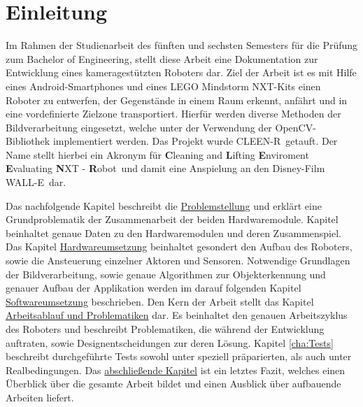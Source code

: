 \chapter{Einleitung}
\label{cha:einleitung}

Im Rahmen der Studienarbeit des fünften und sechsten Semesters für die Prüfung zum Bachelor of Engineering, stellt diese Arbeit eine Dokumentation zur Entwicklung eines kameragestützten Roboters dar. Ziel der Arbeit ist es mit Hilfe eines Android-Smartphones und eines LEGO Mindstorm NXT-Kits einen Roboter zu entwerfen, der Gegenstände in einem Raum erkennt, anfährt und in eine vordefinierte Zielzone transportiert. Hierfür werden diverse Methoden der Bildverarbeitung eingesetzt, welche unter der Verwendung der OpenCV-Bibliothek \cite{opencv_library} implementiert werden. Das Projekt wurde \glqq CLEEN-R\grqq\ getauft. Der Name stellt hierbei ein Akronym für \glqq \textbf{C}leaning and \textbf{L}ifting \textbf{E}nviroment \textbf{E}valuating \textbf{N}XT - \textbf{R}obot\grqq\ und damit eine Anspielung an den Disney-Film \glqq WALL-E\grqq\ dar.

Das nachfolgende Kapitel beschreibt die \hyperref[cha:Problemstellung]{Problemstellung} und erklärt eine Grundproblematik der Zusammenarbeit der beiden Hardwaremodule. Kapitel  beinhaltet genaue Daten zu den Hardwaremodulen und deren Zusammenspiel. Das Kapitel \hyperref[cha:robot]{Hardwareumsetzung} beinhaltet gesondert den Aufbau des Roboters, sowie die Ansteuerung einzelner Aktoren und Sensoren. Notwendige Grundlagen der Bildverarbeitung, sowie genaue Algorithmen zur Objekterkennung und genauer Aufbau der Applikation werden im darauf folgenden Kapitel \hyperref[cha:Software]{Softwareumsetzung} beschrieben. Den Kern der Arbeit stellt das Kapitel \hyperref[cha:Workloop]{Arbeitsablauf und Problematiken} dar. Es beinhaltet den genauen Arbeitszyklus des Roboters und beschreibt Problematiken, die während der Entwicklung auftraten, sowie Designentscheidungen zur deren Lösung. Kapitel \ref{cha:Tests} beschreibt durchgeführte Tests sowohl unter speziell präparierten, als auch unter Realbedingungen. Das \hyperref[cha:Fazit]{abschließende Kapitel} ist ein letztes Fazit, welches einen Überblick über die gesamte Arbeit bildet und einen Ausblick über aufbauende Arbeiten liefert.



